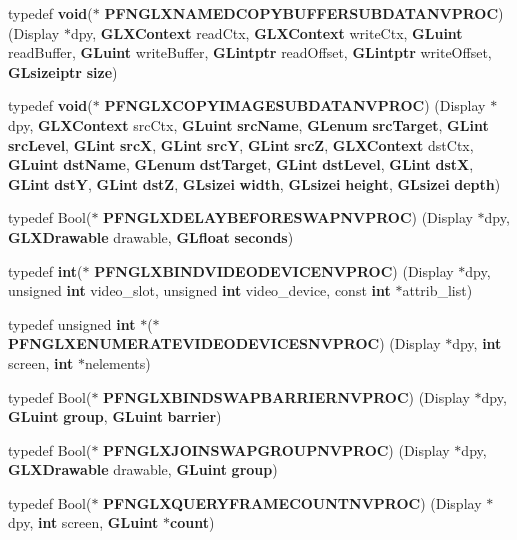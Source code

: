 \begin{DoxyCompactItemize}
\item 
typedef {\bf void}($\ast$ {\bf P\+F\+N\+G\+L\+X\+N\+A\+M\+E\+D\+C\+O\+P\+Y\+B\+U\+F\+F\+E\+R\+S\+U\+B\+D\+A\+T\+A\+N\+V\+P\+R\+OC}) (Display $\ast$dpy, {\bf G\+L\+X\+Context} read\+Ctx, {\bf G\+L\+X\+Context} write\+Ctx, {\bf G\+Luint} read\+Buffer, {\bf G\+Luint} write\+Buffer, {\bf G\+Lintptr} read\+Offset, {\bf G\+Lintptr} write\+Offset, {\bf G\+Lsizeiptr} {\bf size})
\item 
typedef {\bf void}($\ast$ {\bf P\+F\+N\+G\+L\+X\+C\+O\+P\+Y\+I\+M\+A\+G\+E\+S\+U\+B\+D\+A\+T\+A\+N\+V\+P\+R\+OC}) (Display $\ast$dpy, {\bf G\+L\+X\+Context} src\+Ctx, {\bf G\+Luint} {\bf src\+Name}, {\bf G\+Lenum} {\bf src\+Target}, {\bf G\+Lint} {\bf src\+Level}, {\bf G\+Lint} {\bf srcX}, {\bf G\+Lint} {\bf srcY}, {\bf G\+Lint} {\bf srcZ}, {\bf G\+L\+X\+Context} dst\+Ctx, {\bf G\+Luint} {\bf dst\+Name}, {\bf G\+Lenum} {\bf dst\+Target}, {\bf G\+Lint} {\bf dst\+Level}, {\bf G\+Lint} {\bf dstX}, {\bf G\+Lint} {\bf dstY}, {\bf G\+Lint} {\bf dstZ}, {\bf G\+Lsizei} {\bf width}, {\bf G\+Lsizei} {\bf height}, {\bf G\+Lsizei} {\bf depth})
\item 
typedef Bool($\ast$ {\bf P\+F\+N\+G\+L\+X\+D\+E\+L\+A\+Y\+B\+E\+F\+O\+R\+E\+S\+W\+A\+P\+N\+V\+P\+R\+OC}) (Display $\ast$dpy, {\bf G\+L\+X\+Drawable} drawable, {\bf G\+Lfloat} {\bf seconds})
\item 
typedef {\bf int}($\ast$ {\bf P\+F\+N\+G\+L\+X\+B\+I\+N\+D\+V\+I\+D\+E\+O\+D\+E\+V\+I\+C\+E\+N\+V\+P\+R\+OC}) (Display $\ast$dpy, unsigned {\bf int} video\+\_\+slot, unsigned {\bf int} video\+\_\+device, const {\bf int} $\ast$attrib\+\_\+list)
\item 
typedef unsigned {\bf int} $\ast$($\ast$ {\bf P\+F\+N\+G\+L\+X\+E\+N\+U\+M\+E\+R\+A\+T\+E\+V\+I\+D\+E\+O\+D\+E\+V\+I\+C\+E\+S\+N\+V\+P\+R\+OC}) (Display $\ast$dpy, {\bf int} screen, {\bf int} $\ast$nelements)
\item 
typedef Bool($\ast$ {\bf P\+F\+N\+G\+L\+X\+B\+I\+N\+D\+S\+W\+A\+P\+B\+A\+R\+R\+I\+E\+R\+N\+V\+P\+R\+OC}) (Display $\ast$dpy, {\bf G\+Luint} {\bf group}, {\bf G\+Luint} {\bf barrier})
\item 
typedef Bool($\ast$ {\bf P\+F\+N\+G\+L\+X\+J\+O\+I\+N\+S\+W\+A\+P\+G\+R\+O\+U\+P\+N\+V\+P\+R\+OC}) (Display $\ast$dpy, {\bf G\+L\+X\+Drawable} drawable, {\bf G\+Luint} {\bf group})
\item 
typedef Bool($\ast$ {\bf P\+F\+N\+G\+L\+X\+Q\+U\+E\+R\+Y\+F\+R\+A\+M\+E\+C\+O\+U\+N\+T\+N\+V\+P\+R\+OC}) (Display $\ast$dpy, {\bf int} screen, {\bf G\+Luint} $\ast${\bf count})
\item 

\end{DoxyCompactItemize}
